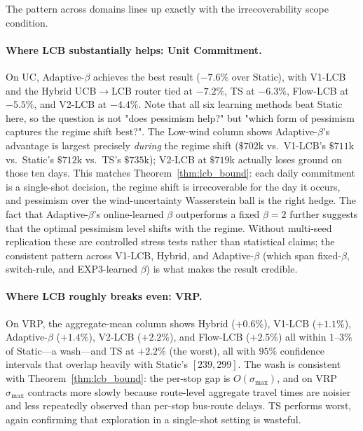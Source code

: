 \documentclass[opre,dblanonrev]{informs4}
\begin{document}
\begin{APPENDICES}
The pattern across domains lines up exactly with the
irrecoverability scope condition.

\paragraph{Where LCB substantially helps: Unit Commitment.}
On UC, Adaptive-$\beta$ achieves the best result ($-7.6\%$ over
Static), with V1-LCB and the Hybrid UCB$\to$LCB router tied at
$-7.2\%$, TS at $-6.3\%$, Flow-LCB at $-5.5\%$, and V2-LCB at
$-4.4\%$. Note that all six learning methods beat Static here, so
the question is not "does pessimism help?" but "which form of
pessimism captures the regime shift best?". The Low-wind
column shows Adaptive-$\beta$'s advantage is largest precisely
\emph{during} the regime shift ($\$702$k vs.\ V1-LCB's $\$711$k vs.\
Static's $\$712$k vs.\ TS's $\$735$k); V2-LCB at $\$719$k actually
loses ground on those ten days. This matches
Theorem~\ref{thm:lcb_bound}: each daily commitment is a single-shot
decision, the regime shift is irrecoverable for the day it occurs,
and pessimism over the wind-uncertainty Wasserstein ball is the
right hedge. The fact that Adaptive-$\beta$'s online-learned
$\beta$ outperforms a fixed $\beta=2$ further suggests that the
optimal pessimism level shifts with the regime. Without multi-seed
replication these are controlled stress tests rather than
statistical claims; the consistent pattern across V1-LCB, Hybrid,
and Adaptive-$\beta$ (which span fixed-$\beta$, switch-rule, and
EXP3-learned $\beta$) is what makes the result credible.

\paragraph{Where LCB roughly breaks even: VRP.}
On VRP, the aggregate-mean column shows Hybrid ($+0.6\%$),
V1-LCB ($+1.1\%$), Adaptive-$\beta$ ($+1.4\%$), V2-LCB
($+2.2\%$), and Flow-LCB ($+2.5\%$) all within $1$--$3\%$ of
Static---a wash---and TS at $+2.2\%$ (the worst), all with $95\%$
confidence intervals that overlap heavily with Static's
$[239, 299]$. The wash is consistent with
Theorem~\ref{thm:lcb_bound}: the per-stop gap is $O(\sigma_{\max})$,
and on VRP $\sigma_{\max}$ contracts more slowly because route-level
aggregate travel times are noisier and less repeatedly observed than
per-stop bus-route delays. TS performs worst, again confirming that
exploration in a single-shot setting is wasteful.


\end{APPENDICES}
\end{document}
